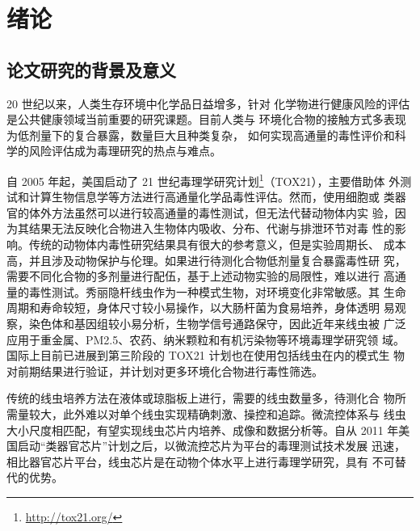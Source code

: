 
\chapter{绪论}
\label{chap:intro}

\section{论文研究的背景及意义}
\label{sec:intro:analog}
	20 世纪以来，人类生存环境中化学品日益增多，针对
	化学物进行健康风险的评估是公共健康领域当前重要的研究课题。目前人类与
	环境化合物的接触方式多表现为低剂量下的复合暴露，数量巨大且种类复杂，
	如何实现高通量的毒性评价和科学的风险评估成为毒理研究的热点与难点。
	
		自 2005 年起，美国启动了 21 世纪毒理学研究计划\footnote{\url{http://tox21.org/}}（TOX21），主要借助体
	外测试和计算生物信息学等方法进行高通量化学品毒性评估。然而，使用细胞或
	类器官的体外方法虽然可以进行较高通量的毒性测试，但无法代替动物体内实
	验，因为其结果无法反映化合物进入生物体内吸收、分布、代谢与排泄环节对毒
	性的影响。传统的动物体内毒性研究结果具有很大的参考意义，但是实验周期长、
	成本高，并且涉及动物保护与伦理。如果进行待测化合物低剂量复合暴露毒性研
	究，需要不同化合物的多剂量进行配伍，基于上述动物实验的局限性，难以进行
	高通量的毒性测试。秀丽隐杆线虫作为一种模式生物，对环境变化非常敏感。其
	生命周期和寿命较短，身体尺寸较小易操作，以大肠杆菌为食易培养，身体透明
	易观察，染色体和基因组较小易分析，生物学信号通路保守，因此近年来线虫被
	广泛应用于重金属、PM2.5、农药、纳米颗粒和有机污染物等环境毒理学研究领
	域\cite{Soares2017Neurodegeneration,Wu2017Coal,Ana2010Genome,Lucio2017Optimization,Wang2017Mitochondria}。
	国际上目前已进展到第三阶段的 TOX21 计划也在使用包括线虫在内的模式生
	物对前期结果进行验证，并计划对更多环境化合物进行毒性筛选。
	
		传统的线虫培养方法在液体或琼脂板上进行，需要的线虫数量多，待测化合
	物所需量较大，此外难以对单个线虫实现精确刺激、操控和追踪。微流控体系与
	线虫大小尺度相匹配，有望实现线虫芯片内培养、成像和数据分析等。自从 2011
	年美国启动“类器官芯片”计划之后，以微流控芯片为平台的毒理测试技术发展
	迅速，相比器官芯片平台，线虫芯片是在动物个体水平上进行毒理学研究，具有
	不可替代的优势。
	
